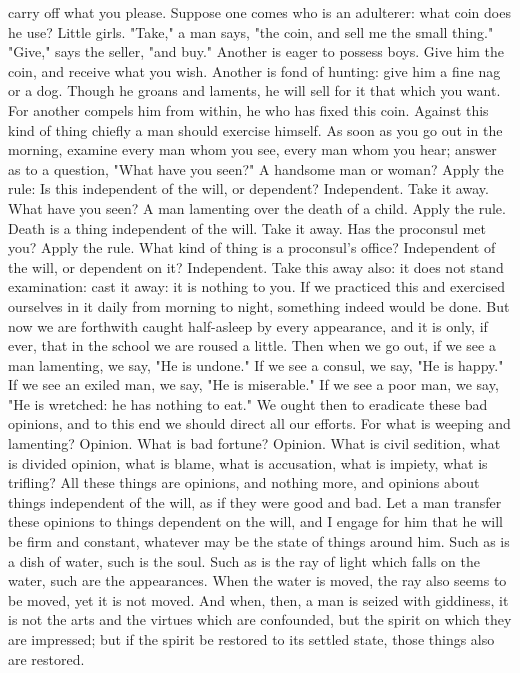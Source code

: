 \documentclass[a4paper]{article}
\begin{document}
carry off what you please. Suppose one comes who is an adulterer: what coin
does he use? Little girls. "Take," a man says, "the coin, and sell me the small
thing." "Give," says the seller, "and buy." Another is eager to possess boys.
Give him the coin, and receive what you wish. Another is fond of hunting: give
him a fine nag or a dog. Though he groans and laments, he will sell for it that
which you want. For another compels him from within, he who has fixed this
coin.
    Against this kind of thing chiefly a man should exercise himself. As soon
as you go out in the morning, examine every man whom you see, every man whom
you hear; answer as to a question, "What have you seen?" A handsome man or
woman? Apply the rule: Is this independent of the will, or dependent?
Independent. Take it away. What have you seen? A man lamenting over the death
of a child. Apply the rule. Death is a thing independent of the will. Take it
away. Has the proconsul met you? Apply the rule. What kind of thing is a
proconsul's office? Independent of the will, or dependent on it? Independent.
Take this away also: it does not stand examination: cast it away: it is nothing
to you.
    If we practiced this and exercised ourselves in it daily from morning to
night, something indeed would be done. But now we are forthwith caught
half-asleep by every appearance, and it is only, if ever, that in the school we
are roused a little. Then when we go out, if we see a man lamenting, we say,
"He is undone." If we see a consul, we say, "He is happy." If we see an exiled
man, we say, "He is miserable." If we see a poor man, we say, "He is wretched:
he has nothing to eat."
    We ought then to eradicate these bad opinions, and to this end we should
direct all our efforts. For what is weeping and lamenting? Opinion. What is bad
fortune? Opinion. What is civil sedition, what is divided opinion, what is
blame, what is accusation, what is impiety, what is trifling? All these things
are opinions, and nothing more, and opinions about things independent of the
will, as if they were good and bad. Let a man transfer these opinions to things
dependent on the will, and I engage for him that he will be firm and constant,
whatever may be the state of things around him. Such as is a dish of water,
such is the soul. Such as is the ray of light which falls on the water, such
are the appearances. When the water is moved, the ray also seems to be moved,
yet it is not moved. And when, then, a man is seized with giddiness, it is not
the arts and the virtues which are confounded, but the spirit on which they are
impressed; but if the spirit be restored to its settled state, those things
also are restored.
\end{document}
